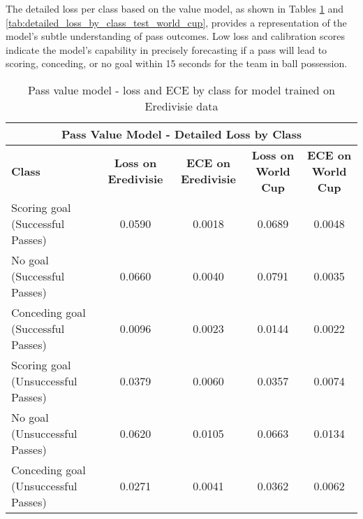 The detailed loss per class based on the value model, as shown in Tables \ref{tab:detailed_loss_by_class_test_eredivisie} and \ref{tab:detailed_loss_by_class_test_world_cup}, provides a representation of the model's subtle understanding of pass outcomes. Low loss and calibration scores indicate the model's capability in precisely forecasting if a pass will lead to scoring, conceding, or no goal within 15 seconds for the team in ball possession.


\begin{table}[h!]
\centering
\caption{Pass value model - loss and ECE by class for model trained on Eredivisie data}
\label{tab:detailed_loss_by_class_test_eredivisie}
\footnotesize

\vspace{3mm}
\begin{tabular}{|l|c|c|c|c|}
\hline
\multicolumn{5}{|c|}{\textbf{Pass Value Model - Detailed Loss by Class}} \\ \hline
\textbf{Class} & \textbf{Loss on Eredivisie} & \textbf{ECE on Eredivisie} & \textbf{Loss on World Cup} & \textbf{ECE on World Cup} \\ \hline
Scoring goal (Successful Passes) & 0.0590 & 0.0018 & 0.0689 & 0.0048 \\ \hline
No goal (Successful Passes) & 0.0660 & 0.0040 & 0.0791 & 0.0035 \\ \hline
Conceding goal (Successful Passes) & 0.0096 & 0.0023 & 0.0144 & 0.0022 \\ \hline
Scoring goal (Unsuccessful Passes) & 0.0379 & 0.0060 & 0.0357 & 0.0074 \\ \hline
No goal (Unsuccessful Passes) & 0.0620 & 0.0105 & 0.0663 & 0.0134 \\ \hline
Conceding goal (Unsuccessful Passes) & 0.0271 & 0.0041 & 0.0362 & 0.0062 \\ \hline
\end{tabular}
\end{table}


